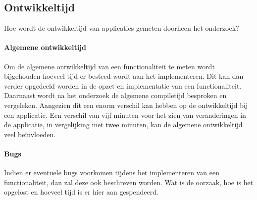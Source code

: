 \subsection{Ontwikkeltijd}
Hoe wordt de ontwikkeltijd van applicaties gemeten doorheen het onderzoek?

\paragraph{Algemene ontwikkeltijd}
Om de algemene ontwikkeltijd van een functionaliteit te meten wordt bijgehouden 
hoeveel tijd er besteed wordt aan het implementeren. Dit kan dan verder 
opgedeeld worden in de opzet en implementatie van een functionaliteit. 
Daarnaast wordt na het onderzoek de algemene compiletijd besproken en vergeleken. 
Aangezien dit een enorm verschil kan hebben op de ontwikkeltijd bij een applicatie. 
Een verschil van vijf minuten voor het zien van veranderingen 
in de applicatie, in vergelijking met twee minuten, kan de algemene 
ontwikkeltijd veel beïnvloeden.

\paragraph{Bugs}
Indien er eventuele bugs voorkomen tijdens het implementeren van een 
functionaliteit, dan zal deze ook beschreven worden. Wat is de oorzaak, 
hoe is het opgelost en hoeveel tijd is er hier aan gespendeerd.

